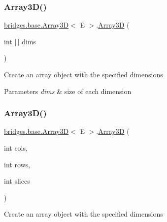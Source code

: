 \mbox{\label{classbridges_1_1base_1_1_array3_d_a015b271607e8b2b9e1425255f229af1b}} 
\subsubsection{\texorpdfstring{Array3\+D()}{Array3D()}\hspace{0.1cm}{\footnotesize\ttfamily [2/3]}}
{\footnotesize\ttfamily \hyperlink{classbridges_1_1base_1_1_array3_d}{bridges.\+base.\+Array3D}$<$ E $>$.\hyperlink{classbridges_1_1base_1_1_array3_d}{Array3D} (\begin{DoxyParamCaption}\item[{int \mbox{[}$\,$\mbox{]}}]{dims }\end{DoxyParamCaption})}

Create an array object with the specified dimensions


\begin{DoxyParams}{Parameters}
{\em dims} & size of each dimension \\
\hline
\end{DoxyParams}
\mbox{\label{classbridges_1_1base_1_1_array3_d_a0d7fc7fd13435f6a8fb55a716d57dd01}} 
\subsubsection{\texorpdfstring{Array3\+D()}{Array3D()}\hspace{0.1cm}{\footnotesize\ttfamily [3/3]}}
{\footnotesize\ttfamily \hyperlink{classbridges_1_1base_1_1_array3_d}{bridges.\+base.\+Array3D}$<$ E $>$.\hyperlink{classbridges_1_1base_1_1_array3_d}{Array3D} (\begin{DoxyParamCaption}\item[{int}]{cols,  }\item[{int}]{rows,  }\item[{int}]{slices }\end{DoxyParamCaption})}

Create an array object with the specified dimensions


